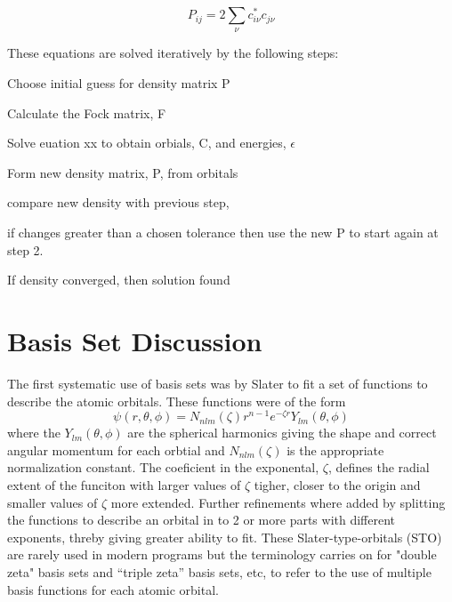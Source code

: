\begin{equation}
P_{ij} = 2\sum_{\nu} c_{i\nu}^*c_{j\nu}
\end{equation}

These equations are solved iteratively by the following steps:
\begin{enumerate}
\setlength\leftmargin{6pt}
\setlength{}
{\setlength\itemindent{25pt}	\item Choose initial guess for density matrix P}
{\setlength\itemindent{25pt}	\item Calculate the Fock matrix, F}
{\setlength\itemindent{25pt}	\item Solve euation xx to obtain orbials, C, and energies, $\epsilon$}
{\setlength\itemindent{25pt}	\item Form new density matrix, P, from orbitals}
{\setlength\itemindent{25pt} 	\item compare new density with previous step,}
   \begin{enumerate}
    {\setlength\itemindent{15pt} \setlength{} \item if changes greater than a chosen tolerance then use the new P to start again at step 2.}
    {\setlength\itemindent{15pt} \setlength{} \item If density converged, then solution found}
   \end{enumerate}
\end{enumerate}

\section{Basis Set Discussion}

  
  The first systematic use of basis sets was by Slater\cite{???} to fit a set of functions to describe the atomic orbitals.  These functions were of the form 
\begin{equation}
   \psi \left(r, \theta ,\phi \right) = N_{nlm}\left(\zeta\right) r^{n-1}e^{-\zeta r}Y_{lm}\left(\theta,\phi\right)
\end{equation}
where the $Y_{lm}\left(\theta,\phi\right)$ are the spherical harmonics giving the shape and correct angular momentum for each orbtial and $N_{nlm}\left(\zeta\right)$ is the appropriate normalization constant.  The coeficient in the exponental, $\zeta$, defines the radial extent of the funciton with larger values of $\zeta$ tigher, closer to the origin and smaller values of $\zeta$ more extended.
  Further refinements where added by splitting the functions to describe an orbital in to 2 or more parts with different exponents, threby giving greater ability to fit.  These Slater-type-orbitals (STO) are rarely used in modern programs but the terminology carries on for "double zeta" basis sets and "`triple zeta"' basis sets, etc, to refer to the use of multiple basis functions for each atomic orbital.
  
